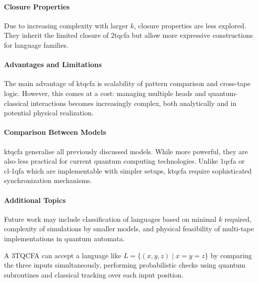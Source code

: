 \paragraph{Closure Properties}  
Due to increasing complexity with larger $k$, closure properties are less explored. They inherit the limited closure of \gls{2tqcfa} but allow more expressive constructions for language families.

\paragraph{Advantages and Limitations}  
The main advantage of \gls{ktqcfa} is scalability of pattern comparison and cross-tape logic. However, this comes at a cost: managing multiple heads and quantum-classical interactions becomes increasingly complex, both analytically and in potential physical realization.

\paragraph{Comparison Between Models}  
\gls{ktqcfa} generalise all previously discussed models. While more powerful, they are also less practical for current quantum computing technologies. Unlike \gls{1qcfa} or \gls{cl-1qfa} which are implementable with simpler setups, \gls{ktqcfa} require sophisticated synchronization mechanisms.

\paragraph{Additional Topics}  
Future work may include classification of languages based on minimal $k$ required, complexity of simulations by smaller models, and physical feasibility of multi-tape implementations in quantum automata.

\begin{example} 
A 3TQCFA can accept a language like $L = \{ (x, y, z) \mid x = y = z \}$ by comparing the three inputs simultaneously, performing probabilistic checks using quantum subroutines and classical tracking over each input position.
\end{example}